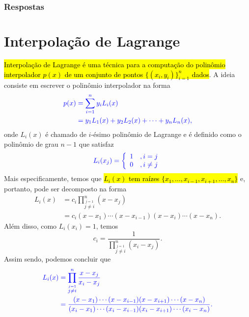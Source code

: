 \ifisbook
\subsubsection{Respostas}
\shipoutAnswer
\fi


\section{Interpolação de Lagrange}\label{cap_interp_sec_lagrange}

\hl{Interpolação de Lagrange{\lagrange} é uma técnica para a computação do polinômio interpolador $p(x)$ de um conjunto de pontos $\{(x_i, y_i)\}_{i=1}^n$ dados}. A ideia consiste em escrever o polinômio interpolador na forma
\begin{subequations}\hleq
  \begin{align}
    p(x) &= \sum_{i=1}^n y_iL_i(x)\\
         &= y_1L_1(x) + y_2L_2(x) + \cdots + y_nL_n(x),
  \end{align}
\end{subequations}
onde $L_i(x)$ é chamado de $i$-ésimo polinômio de Lagrange e é definido como o polinômio de grau $n-1$ que satisfaz
\begin{equation}\color{blue}L_i(x_j) = \left\{
    \begin{array}{ll}
      1 &, i=j\\
      0 &, i\neq j
    \end{array}
\right.
\end{equation}
Mais especificamente, temos que \hl{$L_i(x)$ tem raízes $\{x_1, \ldots, x_{i-1}, x_{i+1}, \ldots, x_n\}$} e, portanto, pode ser decomposto na forma
\begin{subequations}
  \begin{align}
    L_i(x) &= c_i\prod_{\overset{j=1}{j\neq i}}^n (x-x_j)\\
           &= c_i(x-x_1)\cdots(x-x_{i-1})(x-x_i)\cdots(x-x_n).
  \end{align}
\end{subequations}
Além disso, como $L_i(x_i) = 1$, temos
\begin{equation}
  c_i = \frac{1}{\displaystyle\prod_{\overset{j=1}{j\neq i}}^n (x_i-x_j)}.
\end{equation}
Assim sendo, podemos concluir que
\begin{subequations}\hleq
  \begin{align}
    L_i(x) &= \prod_{\overset{j=1}{j\neq i}}^n \frac{x-x_j}{x_i-x_j}\\
           &= \frac{(x-x_1)\cdots(x-x_{i-1})(x-x_{i+1})\cdots(x-x_n)}{(x_i-x_1)\cdots(x_i-x_{i-1})(x_i-x_{i+1})\cdots(x_i-x_n)}.
  \end{align}
\end{subequations}

